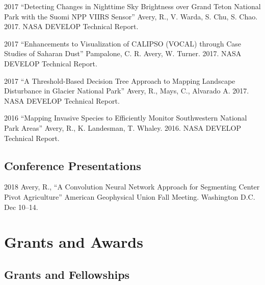 \documentclass[12pt,letterpaper]{report}
\begin{document}
	\begin{tablist}
		
		\item[2017] \tab \enquote{Detecting Changes in Nighttime Sky Brightness over Grand Teton National Park with the Suomi NPP VIIRS Sensor} Avery, R., V. Warda, S. Chu, S. Chao. 2017. NASA DEVELOP Technical Report. 

	   	\item[2017] \tab \enquote{Enhancements to Visualization of CALIPSO (VOCAL) through Case Studies of Saharan Dust} Pampalone, C. R. Avery, W. Turner. 2017. NASA DEVELOP Technical Report.

       	\item[2017] \tab \enquote{A Threshold-Based Decision Tree Approach to Mapping Landscape Disturbance in Glacier National Park} Avery, R., Mays, C., Alvarado A. 2017. NASA DEVELOP Technical Report.

        \item[2016] \tab \enquote{Mapping Invasive Species to Efficiently Monitor Southwestern National Park Areas} Avery, R., K. Landesman, T. Whaley. 2016. NASA DEVELOP Technical Report.
	
    \end{tablist}

	
	\subsection*{Conference Presentations}
	
	\begin{tablist}
		
		\item[2018] \tab Avery, R., \enquote{A Convolution Neural Network Approach for Segmenting Center Pivot Agriculture} American Geophysical Union Fall Meeting. Washington D.C. Dec 10--14.
						
	\end{tablist}
	
	
	
	\section*{Grants and Awards}
	
	\subsection*{Grants and Fellowships}
	
\end{document}
